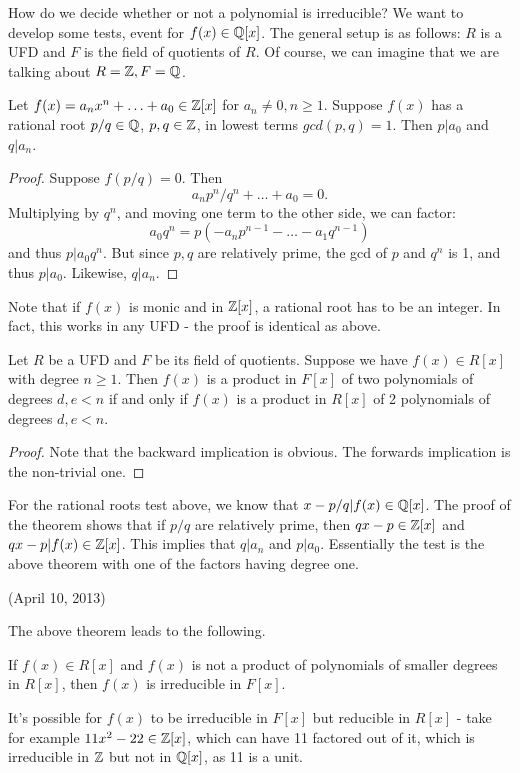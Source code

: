 \documentclass{../mathnotes}
\begin{document}
How do we decide whether or not a polynomial is irreducible? We want to develop some tests, event for $f(x)\in\mathbb{Q}[x]$. The general
setup is as follows: $R$ is a UFD and $F$ is the field of quotients of $R$. Of course, we can imagine that we are talking about
$R=\mathbb{Z},F=\mathbb{Q}$.

\begin{exmp}
    Let $f(x)=a_nx^n+\ldots+a_0\in\mathbb{Z}[x]$ for $a_n\neq 0,n\geq 1$. Suppose $f(x)$ has a rational root $p/q\in\mathbb{Q}$, $p,q\in\mathbb{Z}$,
    in lowest terms $gcd(p,q)=1$. Then $p|a_0$ and $q|a_n$.
\end{exmp}
\begin{proof}
    Suppose $f(p/q)=0$. Then
    \[a_np^n/q^n+\ldots+a_0=0.\]
    Multiplying by $q^n$, and moving one term to the other side, we can factor:
    \[a_0q^n=p(-a_np^{n-1}-\ldots-a_1q^{n-1})\]
    and thus $p|a_0q^n$. But since $p,q$ are relatively prime, the gcd of $p$ and $q^n$ is 1, and thus $p|a_0$.
    Likewise, $q|a_n$.
\end{proof}

Note that if $f(x)$ is monic and in $\mathbb{Z}[x]$, a rational root has to be an integer. In fact, this works in any UFD -
the proof is identical as above.

\begin{thm}
    Let $R$ be a UFD and $F$ be its field of quotients. Suppose we have $f(x)\in R[x]$ with degree $n\geq 1$. Then $f(x)$ is a product in $F[x]$
    of two polynomials of degrees $d,e<n$ if and only if $f(x)$ is a product in $R[x]$ of 2 polynomials of degrees $d,e<n$.
\end{thm}
\begin{proof}
    Note that the backward implication is obvious. The forwards implication is the non-trivial one.
\end{proof}

For the rational roots test above, we know that $x-p/q|f(x)\in\mathbb{Q}[x]$. The proof of the theorem shows that if $p/q$ are relatively prime,
then $qx-p\in\mathbb{Z}[x]$ and $qx-p|f(x)\in\mathbb{Z}[x]$. This implies that $q|a_n$ and $p|a_0$. Essentially the test is the above theorem with one of the
factors having degree one.

(April 10, 2013)

The above theorem leads to the following.
\begin{cor}
    If $f(x)\in R[x]$ and $f(x)$ is not a product of polynomials of smaller degrees in $R[x]$, then $f(x)$ is irreducible in $F[x]$.
\end{cor}
It's possible for $f(x)$ to be irreducible in $F[x]$ but reducible in $R[x]$ - take for example $11x^2-22\in\mathbb{Z}[x]$, which can have 11 factored
out of it, which is irreducible in $\mathbb{Z}$ but not in $\mathbb{Q}[x]$, as 11 is a unit.
\end{document}
